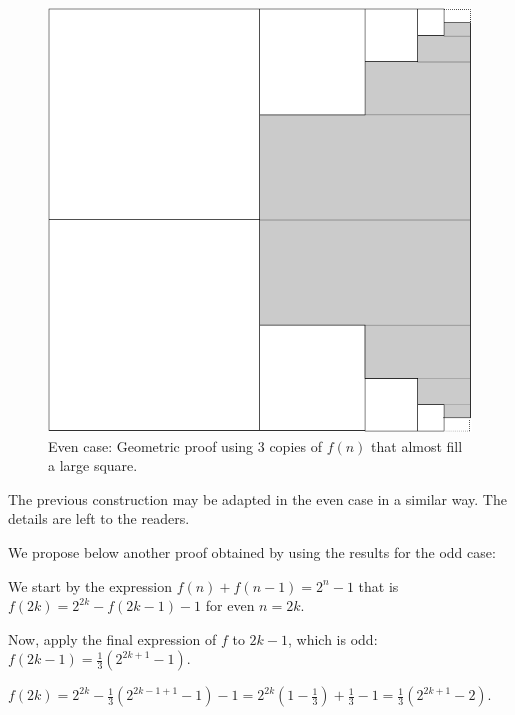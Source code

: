 {\begin{figure} [h]
\begin{center}
        \includegraphics[scale=0.4]{FiguresMaths/alternatePowers2odd.png}
        \caption{Even case: Geometric proof using 3 copies of $f(n)$ that almost fill a large square.}
        \label{fig:alternatePowers2finalOdd}
\end{center}
\end{figure}

The previous construction may be adapted in the even case in a similar way.
The details are left to the readers. 

We propose below another proof obtained by using the results for the odd case:

We start by the expression $f(n) + f(n-1) = 2^n -1$
that is $f(2k) = 2^{2k} - f(2k-1) -1$ for even $n=2k$.

Now, apply the final expression of $f$ to $2k-1$, which is odd: $f(2k-1) = \frac{1}{3} (2^{2k+1}-1)$.

$f(2k) = 2^{2k} - \frac{1}{3} (2^{2k-1+1}-1) -1 = 2^{2k} (1-\frac{1}{3}) + \frac{1}{3} -1= \frac{1}{3} (2^{2k+1} -2)$.
\bigskip

}

